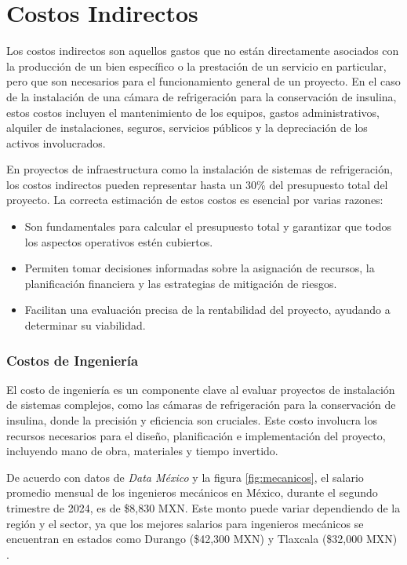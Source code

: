   
\section{Costos Indirectos}

Los costos indirectos son aquellos gastos que no están directamente asociados con la producción de un bien específico o la prestación de un servicio en particular, pero que son necesarios para el funcionamiento general de un proyecto. En el caso de la instalación de una cámara de refrigeración para la conservación de insulina, estos costos incluyen el mantenimiento de los equipos, gastos administrativos, alquiler de instalaciones, seguros, servicios públicos y la depreciación de los activos involucrados.

En proyectos de infraestructura como la instalación de sistemas de refrigeración, los costos indirectos pueden representar hasta un 30\% del presupuesto total del proyecto. La correcta estimación de estos costos es esencial por varias razones:

\begin{itemize}
	\item Son fundamentales para calcular el presupuesto total y garantizar que todos los aspectos operativos estén cubiertos.
	\item Permiten tomar decisiones informadas sobre la asignación de recursos, la planificación financiera y las estrategias de mitigación de riesgos.
	\item Facilitan una evaluación precisa de la rentabilidad del proyecto, ayudando a determinar su viabilidad.
\end{itemize}

\subsubsection{Costos de Ingeniería}

El costo de ingeniería es un componente clave al evaluar proyectos de instalación de sistemas complejos, como las cámaras de refrigeración para la conservación de insulina, donde la precisión y eficiencia son cruciales. Este costo involucra los recursos necesarios para el diseño, planificación e implementación del proyecto, incluyendo mano de obra, materiales y tiempo invertido.

De acuerdo con datos de \textit{Data México} y la figura \ref{fig:mecanicos}, el salario promedio mensual de los ingenieros mecánicos en México, durante el segundo trimestre de 2024, es de \$8,830 MXN. Este monto puede variar dependiendo de la región y el sector, ya que los mejores salarios para ingenieros mecánicos se encuentran en estados como Durango (\$42,300 MXN) y Tlaxcala (\$32,000 MXN) \cite{salarioingeniero}. 

